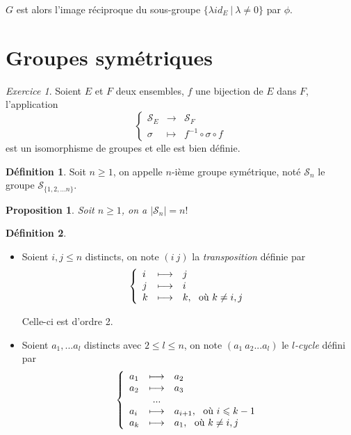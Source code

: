 \documentclass[]{article}
\newtheorem{myproposition}{Proposition}
\theoremstyle{remark}
\newtheorem{myexer}{Exercice}
\theoremstyle{definition}
\newtheorem{mydef}{Définition}
\newcommand{\anonfunc}[4]{
\left\{ \begin{array}{lcl}
	#1 & \longrightarrow & #2 \\
	#3 & \longmapsto & #4
\end{array}
\right.
}
\begin{document}
$G$ est alors l'image réciproque du sous-groupe $\{\lambda id_E ~ | ~ \lambda \neq 0\}$ par $\phi$.

\part{Groupes symétriques}

\begin{myexer}
	Soient $E$ et $F$ deux ensembles, $f$ une bijection de $E$ dans $F$, l'application
	$$\anonfunc{\mathcal{S}_E}{\mathcal{S}_F}{\sigma}{f^{-1} \circ \sigma \circ f}$$
	est un isomorphisme de groupes et elle est bien définie.
\end{myexer}

\begin{mydef}
	Soit $n \geqslant 1$, on appelle $n$-ième groupe symétrique, noté $\mathcal{S}_n$ le groupe $\mathcal{S}_{\{1, 2, ...n\}}$.
\end{mydef}

\begin{myproposition}
	Soit $n \geqslant 1$, on a $\left|\mathcal{S}_n\right| = n!$
\end{myproposition}

\begin{mydef}
	\leavevmode
	\begin{itemize}
		\item Soient $i, j \leqslant n$ distincts, on note $(i ~ j)$ la \textit{transposition} définie par
		$$\left\{
			\begin{array}{l c l}
				i & \longmapsto & j \\
				j & \longmapsto & i \\
				k & \longmapsto & k, ~ \text{ où } k \neq i, j
			\end{array}
		\right.$$
		
		Celle-ci est d'ordre 2.
		
		\item Soient $a_1, ...a_l$ distincts avec $2 \leqslant l \leqslant n$, on note $(a_1 ~ a_2 ... a_l)$ le \textit{$l$-cycle} défini par
		$$\left\{
			\begin{array}{l c l}
				a_1 & \longmapsto & a_2 \\
				a_2 & \longmapsto & a_3 \\
				&...& \\
				a_i & \longmapsto & a_{i+1}, ~ \text{ où } i \leqslant k-1 \\
				a_k & \longmapsto & a_1, ~ \text{ où } k \neq i, j
			\end{array}
		\right.$$
	\end{itemize}
\end{mydef}
\end{document}
